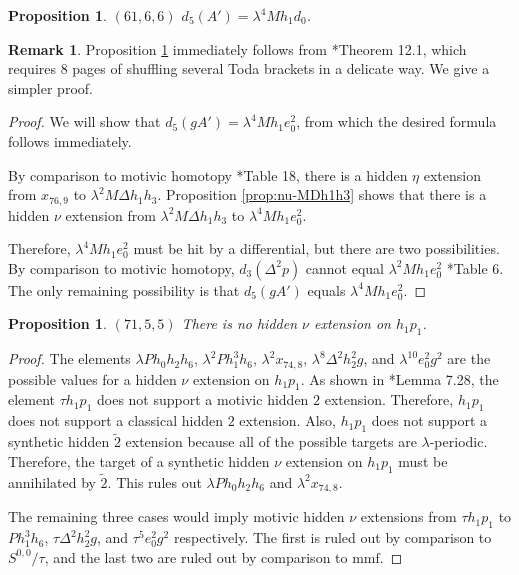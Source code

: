 \documentclass{amsart}
\newtheorem{prop}[thm]{Proposition}
\theoremstyle{definition}
\newtheorem{rmk}[thm]{Remark}
\newcommand{\hsf}{\widetilde{2}}
\newcommand{\mmf}{\mathrm{mmf}}
\newcommand{\lemdeg}[1]{$({#1})$}
\newcommand{\D}{\Delta}
\begin{document}
\begin{prop}
\label{prop:d5-A'}
\lemdeg{61, 6, 6}
$d_5(A') = \lambda^4 M h_1 d_0$.
\end{prop}

\begin{rmk}
Proposition \ref{prop:d5-A'} immediately follows from
\cite{WX17}*{Theorem 12.1}, which requires 8 pages of shuffling several Toda brackets in a delicate way.
We give a simpler proof.
\end{rmk}

\begin{proof}
We will show that $d_5(g A') = \lambda^4 M h_1 e_0^2$, from which the desired
formula follows immediately.

By comparison to motivic homotopy \cite{IWX}*{Table 18}, there is a hidden
$\eta$ extension from $x_{76,9}$ to $\lambda^2 M \D h_1 h_3$.
Proposition \ref{prop:nu-MDh1h3} shows that there is a hidden
$\nu$ extension from $\lambda^2 M \D h_1 h_3$ to
$\lambda^4 M h_1 e_0^2$.  

Therefore, $\lambda^4 M h_1 e_0^2$ must be hit by a differential, but 
there are two possibilities.
By comparison to motivic homotopy,
$d_3(\D^2 p)$ cannot equal $\lambda^2 M h_1 e_0^2$
\cite{IWX}*{Table 6}.
The only remaining possibility is that
$d_5(g A')$ equals $\lambda^4 M h_1 e_0^2$.
\end{proof}



\begin{prop}
\label{prop:nu-h1p1}
\lemdeg{71, 5, 5}
There is no hidden $\nu$ extension on $h_1 p_1$.
\end{prop}

\begin{proof}
The elements
$\lambda P h_0 h_2 h_6$, $\lambda^2 P h_1^3 h_6$, $\lambda^2 x_{74,8}$,
$\lambda^8 \D^2 h_2^2 g$, and $\lambda^{10} e_0^2 g^2$
are the possible values for a hidden $\nu$ extension on $h_1 p_1$.
As shown in \cite{IWX}*{Lemma 7.28}, the element $\tau h_1 p_1$ does not
support a motivic hidden $2$ extension.  Therefore,
$h_1 p_1$ does not support a classical hidden $2$ extension.
Also, $h_1 p_1$ does not support a synthetic hidden $\hsf$ extension
because all of the possible targets are $\lambda$-periodic.
Therefore, the target of a synthetic hidden $\nu$ extension
on $h_1 p_1$ must be annihilated by $\hsf$.
This rules out $\lambda P h_0 h_2 h_6$ and $\lambda^2 x_{74,8}$.

The remaining three cases would imply motivic
hidden $\nu$ extensions from $\tau h_1 p_1$ to
$P h_1^3 h_6$, $\tau \D^2 h_2^2 g$, and $\tau^5 e_0^2 g^2$
respectively.  The first is ruled out by comparison
to $S^{0,0}/\tau$, and the last two are ruled out by comparison to $\mmf$.
\end{proof}
\end{document}
